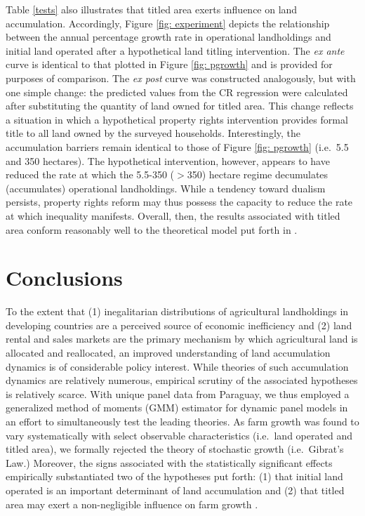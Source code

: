 \documentclass[english]{article}
\begin{document}
Table \ref{tests} also illustrates that titled area exerts influence on land
accumulation. 
Accordingly, Figure \ref{fig: experiment} depicts the relationship between 
the annual percentage growth rate in operational landholdings and initial land 
operated after a hypothetical land titling intervention.
The \emph{ex ante} curve is identical to that plotted in Figure 
\ref{fig: pgrowth} and is provided for purposes of comparison.
The \emph{ex post} curve was constructed analogously, but with one
simple change: the predicted values from the CR regression were calculated
after substituting the quantity of land owned for titled area.
This change reflects a situation in which a hypothetical property rights 
intervention provides formal title to all land owned by the surveyed
households.
Interestingly, the accumulation barriers remain identical to those of Figure
\ref{fig: pgrowth} (i.e.\ 5.5 and 350 hectares).
The hypothetical intervention, however, appears to have reduced the rate at
which the 5.5-350 ($>$350) hectare regime decumulates (accumulates) 
operational landholdings.
While a tendency toward dualism persists, property rights reform may 
thus possess the capacity to reduce the rate at which inequality 
manifests. 
Overall, then, the results associated with titled area conform reasonably well 
to the theoretical model put forth in \citet{carter1998b}.


\section{Conclusions}
\label{sec: conclusions}

To the extent that (1) inegalitarian distributions of agricultural landholdings in 
developing countries are a perceived source of economic inefficiency and (2) 
land rental and sales markets are the primary mechanism by which agricultural 
land is allocated and reallocated, an improved understanding of land 
accumulation dynamics is of considerable policy interest.
While theories of such accumulation dynamics are relatively numerous, 
empirical scrutiny of the associated hypotheses is relatively scarce.
With unique panel data from Paraguay, we thus employed a generalized 
method of moments (GMM) estimator for dynamic panel models in an 
effort to simultaneously test the leading theories.
As farm growth was found to vary systematically with select observable 
characteristics (i.e.\ land operated and titled area), we formally rejected
the theory of stochastic growth (i.e.\ Gibrat's Law.)
Moreover, the signs associated with the statistically significant effects 
empirically substantiated two of the hypotheses put forth: (1) that initial land 
operated is an important determinant of land accumulation 
\citep{carter1993} and (2) that titled area may exert a non-negligible 
influence on farm growth \citep{carter1998b}.
\end{document}
